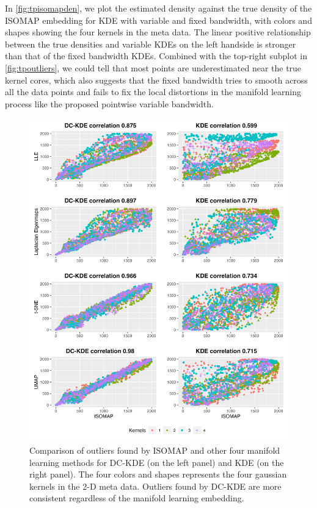 \documentclass[11pt,a4paper,]{article}
\begin{document}
In \autoref{fig:tpisomapden}, we plot the estimated density against the true density of the ISOMAP embedding for KDE with variable and fixed bandwidth, with colors and shapes showing the four kernels in the meta data. The linear positive relationship between the true densities and variable KDEs on the left handside is stronger than that of the fixed bandwidth KDEs. Combined with the top-right subplot in \autoref{fig:tpoutliers}, we could tell that most points are underestimated near the true kernel cores, which also suggests that the fixed bandwidth tries to smooth across all the data points and fails to
fix the local distortions in the manifold learning process like the proposed pointwise variable bandwidth.

\begin{figure}

{\centering \includegraphics[width=0.95\linewidth]{figures/Twin Peak2000_density_comparison_isomapvs4ml_r0_5_rank} 

}

\caption{Comparison of outliers found by ISOMAP and other four manifold learning methods for DC-KDE (on the left panel) and KDE (on the right panel). The four colors and shapes represents the four gaussian kernels in the 2-D meta data. Outliers found by DC-KDE are more consistent regardless of the manifold learning embedding.}\label{fig:tpisomapvs4ml}
\end{figure}
\end{document}

